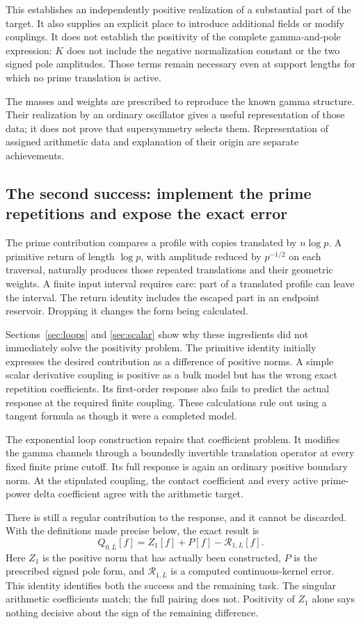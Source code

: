 \documentclass[11pt]{article}
\numberwithin{equation}{section}
\theoremstyle{definition}
\theoremstyle{remark}
\begin{document}
This establishes an independently positive realization of a substantial part of the target. It also supplies an explicit place to introduce additional fields or modify couplings. It does not establish the positivity of the complete gamma-and-pole expression: $K$ does not include the negative normalization constant or the two signed pole amplitudes. Those terms remain necessary even at support lengths for which no prime translation is active.

The masses and weights are prescribed to reproduce the known gamma structure. Their realization by an ordinary oscillator gives a useful representation of those data; it does not prove that supersymmetry selects them. Representation of assigned arithmetic data and explanation of their origin are separate achievements.

\subsection*{The second success: implement the prime repetitions and expose the exact error}
The prime contribution compares a profile with copies translated by $n\log p$. A primitive return of length $\log p$, with amplitude reduced by $p^{-1/2}$ on each traversal, naturally produces those repeated translations and their geometric weights. A finite input interval requires care: part of a translated profile can leave the interval. The return identity includes the escaped part in an endpoint reservoir. Dropping it changes the form being calculated.

Sections~\ref{sec:loops} and \ref{sec:scalar} show why these ingredients did not immediately solve the positivity problem. The primitive identity initially expresses the desired contribution as a difference of positive norms. A simple scalar derivative coupling is positive as a bulk model but has the wrong exact repetition coefficients. Its first-order response also fails to predict the actual response at the required finite coupling. These calculations rule out using a tangent formula as though it were a completed model.

The exponential loop construction repairs that coefficient problem. It modifies the gamma channels through a boundedly invertible translation operator at every fixed finite prime cutoff. Its full response is again an ordinary positive boundary norm. At the stipulated coupling, the contact coefficient and every active prime-power delta coefficient agree with the arithmetic target.

There is still a regular contribution to the response, and it cannot be discarded. With the definitions made precise below, the exact result is
\[
\boxed{\displaystyle
Q_{0,L}[f]=Z_1[f]+P[f]-\mathscr R_{1,L}[f].}
\]
Here $Z_1$ is the positive norm that has actually been constructed, $P$ is the prescribed signed pole form, and $\mathscr R_{1,L}$ is a computed continuous-kernel error. This identity identifies both the success and the remaining task. The singular arithmetic coefficients match; the full pairing does not. Positivity of $Z_1$ alone says nothing decisive about the sign of the remaining difference.
\end{document}

